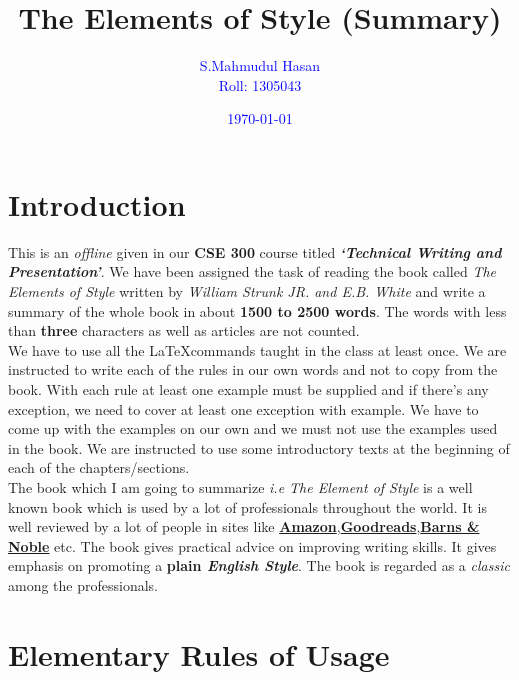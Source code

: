 \documentclass[12pt]{report}
\begin{document}
\title{\textbf{The Elements of Style (Summary)}}
\author{\textcolor{blue}{S.Mahmudul Hasan}\\ \textcolor{blue}{Roll: 1305043}}
\date{\textcolor{blue}{\today}}%
\maketitle
\tableofcontents


\chapter{Introduction}\label{INTRO}

\raggedright  %
This is an \textit{offline} given in our \textbf{CSE 300} course titled \textit{\textbf{`Technical Writing and Presentation'}}. We have been assigned the task of reading the book called \emph{The Elements of Style} written by \emph{William Strunk JR. \emph{and} E.B. White} and write a summary of the whole book in about \textbf{1500 to 2500 words}. The words with less than \textbf{three} characters as well as articles are not counted.\\
We have to use all the \LaTeX commands taught in the class at least once. We are instructed to write each of the rules in our own words and not to copy from the book. With each rule at least one example must be supplied and if there's any exception, we need to cover at least one exception with example. We have to come up with the examples on our own and we must not use the examples used in the book. We are instructed to use some introductory texts at the beginning of each of the chapters/sections.\\
The book which I am going to summarize \textit{i.e The Element of Style} is a well known book which is used by a lot of professionals throughout the world. It is well reviewed by a lot of people in sites like \textbf{\href{https://www.amazon.com/Elements-Style-William-Strunk-Jr/dp/1557427283}{Amazon}},\textbf{\href{http://www.goodreads.com/book/show/33514.The_Elements_of_Style}{Goodreads}},\textbf{\href{http://www.barnesandnoble.com/w/the-elements-of-style-william-strunk/1116794279}{Barns \& Noble}} etc.
The book gives practical advice on improving writing skills. It gives emphasis on promoting a \textbf{plain \textit{English Style}}. The book is regarded as a \emph{classic} among the professionals.




\chapter{Elementary Rules of Usage}\label{ERU}
\end{document}
